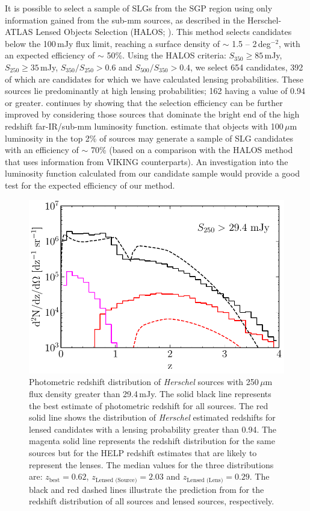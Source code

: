 \documentclass[fleqn,usenatbib]{mnras}
\begin{document}
It is possible to select a sample of SLGs from the SGP region using only information gained from the sub-mm sources, as described in the Herschel-ATLAS Lensed Objects Selection (HALOS; \citealt{GonzalezNuevo_2012}). This method selects candidates below the 100\,mJy flux limit, reaching a surface density of $\sim$ 1.5 -- 2\,deg$^{-2}$, with an expected efficiency of $\sim$ 50\%. Using the HALOS criteria: $S_{350} \geq 85$\,mJy, $S_{250} \geq 35$\,mJy, $S_{350}/S_{250} > 0.6$ and $S_{500}/S_{350} > 0.4$, we select 654 candidates, 392 of which are candidates for which we have calculated lensing probabilities. These sources lie predominantly at high lensing probabilities; 162 having a value of 0.94 or greater. \citealt{GonzalezNuevo_2012} continues by showing that the selection efficiency can be further improved by considering those sources that dominate the bright end of the high redshift far-IR/sub-mm luminosity function. \citealt{GonzalezNuevo_2012} estimate that objects with 100\,$\mu$m luminosity in the top 2\% of sources may generate a sample of SLG candidates with an efficiency of $\sim$ 70\% (based on a comparison with the HALOS method that uses information from VIKING counterparts). An investigation into the luminosity function calculated from our candidate sample would provide a good test for the expected efficiency of our method.


\begin{figure}
	\includegraphics[width=\columnwidth]{Fig_13}
	\caption{Photometric redshift distribution of \textit{Herschel} sources with 250\,$\mu$m flux density greater than 29.4\,mJy. The solid black line represents the best estimate of photometric redshift for all sources. The red solid line shows the distribution of \textit{Herschel} estimated redshifts for lensed candidates with a lensing probability greater than 0.94. The magenta solid line represents the redshift distribution for the same sources but for the HELP redshift estimates that are likely to represent the lenses. The median values for the three distributions are: $z_{\textrm{best}} = 0.62$, $z_{\textrm{Lensed (Source)}} = 2.03$ and $z_{\textrm{Lensed (Lens)}} = 0.29$. The black and red dashed lines illustrate the prediction from \citealt{Cai_2013} for the redshift distribution of all sources and lensed sources, respectively.} 
	\label{fig:lens_z_distribution}
\end{figure}
\end{document}
